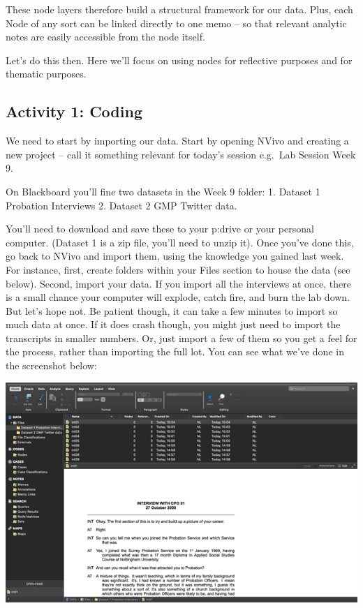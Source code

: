 \documentclass[
]{book}
\begin{document}
These node layers therefore build a structural framework for our data. Plus, each Node of any sort can be linked directly to one memo -- so that relevant analytic notes are easily accessible from the node itself.

Let's do this then. Here we'll focus on using nodes for reflective purposes and for thematic purposes.

\hypertarget{activity-1-coding}{%
\subsection{Activity 1: Coding}\label{activity-1-coding}}

We need to start by importing our data. Start by opening NVivo and creating a new project -- call it something relevant for today's session e.g.~Lab Session Week 9.

On Blackboard you'll fine two datasets in the Week 9 folder: 1. Dataset 1 Probation Interviews 2. Dataset 2 GMP Twitter data.

You'll need to download and save these to your p:drive or your personal computer. (Dataset 1 is a zip file, you'll need to unzip it). Once you've done this, go back to NVivo and import them, using the knowledge you gained last week. For instance, first, create folders within your Files section to house the data (see below). Second, import your data. If you import all the interviews at once, there is a small chance your computer will explode, catch fire, and burn the lab down. But let's hope not. Be patient though, it can take a few minutes to import so much data at once. If it does crash though, you might just need to import the transcripts in smaller numbers. Or, just import a few of them so you get a feel for the process, rather than importing the full lot. You can see what we've done in the screenshot below:

\includegraphics{imgs/interview_w9.png}
\end{document}
